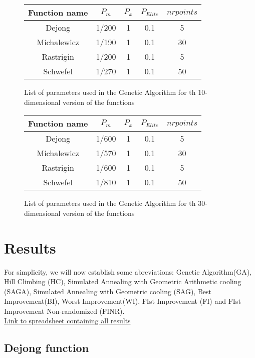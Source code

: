 \documentclass{article}
\begin{document}
\begin{figure}[H]
	\begin{tabular}{|c||c|c|c|c|} \hline
		Function name & $P_m$ & $P_x$ & $P_{Elite}$ &  $nrpoints$\\ \hline \hline
		Dejong & 1/200 & 1 & 0.1 & 5 \\ \hline
		Michalewicz & 1/190 & 1 & 0.1 & 30\\ \hline
		Rastrigin & 1/200 & 1 & 0.1 & 5 \\ \hline
		Schwefel & 1/270 & 1 & 0.1 & 50 \\ \hline
\end{tabular}
\caption{List of parameters used in the Genetic Algorithm for th 10-dimensional version of the functions}
\end{figure}

\begin{figure}[H]
	\begin{tabular}{|c||c|c|c|c|} \hline
		Function name & $P_m$ & $P_x$ & $P_{Elite}$ &  $nrpoints$\\ \hline \hline
		Dejong & 1/600 & 1 & 0.1 & 5 \\ \hline
		Michalewicz & 1/570 & 1 & 0.1 & 30\\ \hline
		Rastrigin & 1/600 & 1 & 0.1 & 5 \\ \hline
		Schwefel & 1/810 & 1 & 0.1 & 50 \\ \hline
\end{tabular}
\caption{List of parameters used in the Genetic Algorithm for th 30-dimensional version of the functions}
\end{figure}

\section{Results}

For simplicity, we will now establish some abreviations: Genetic Algorithm(GA), Hill Climbing (HC), Simulated Annealing with Geometric Arithmetic cooling (SAGA), Simulated Annealing with Geometric cooling (SAG), Best Improvement(BI), Worst Improvement(WI), FIst Improvement (FI) and FIst Improvement Non-randomized (FINR). \\

\href{./h2.xlsx}{Link to spreadsheet containing all results}

\subsection{Dejong function}
\end{document}
